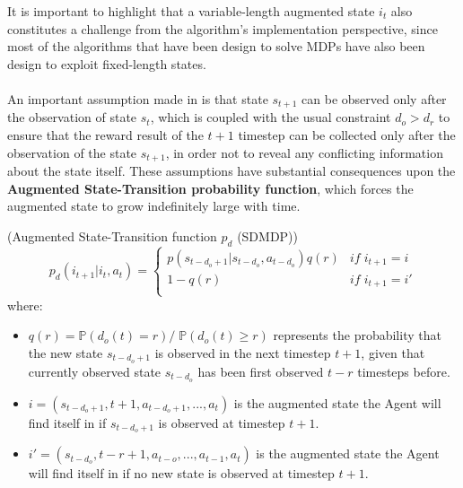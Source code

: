                 It is important to highlight that a variable-length augmented state $i_t$ also constitutes a challenge from the algorithm's implementation perspective, since most of the algorithms that have been design to solve MDPs have also been design to exploit fixed-length states.
                \\\\
                An important assumption made in  is that state $s_{t+1}$ can be observed only after the observation of state $s_t$, which is coupled with the usual constraint $d_o > d_r$ to ensure that the reward result of the $t+1$ timestep can be collected only after the observation of the state $s_{t+1}$, in order not to reveal any conflicting information about the state itself. These assumptions have substantial consequences upon the \textbf{Augmented State-Transition probability function}, which forces the augmented state to grow indefinitely large with time.
                \begin{definition}(Augmented State-Transition function $p_d$ (SDMDP))
                    \label{def:sdmdpaugtrans}
                    \[ p_d \left( i_{t+1} | i_t, a_t \right) =  
                        \begin{cases} 
                            p \left( s_{t-d_o+1} | s_{t-d_o}, a_{t-d_o} \right) q\left(r\right) & if \; i_{t+1} = i \\
                            1 - q\left(r\right) & if \; i_{t+1} = i'\\
                        \end{cases}
                    \]
                    where:
                \end{definition}
                \begin{itemize}[topsep=0.5em, partopsep=0.5em]
                    \setlength\itemsep{0em}
                    \item $q(r) = \mathds{P}\left( d_o(t) = r \right) /\; \mathds{P}\left( d_o(t) \geq r \right) $ represents the probability that the new state $s_{t-d_o+1}$ is observed in the next timestep $t+1$, given that currently observed state $s_{t-d_o}$ has been first observed $t-r$ timesteps before.
                    \item $i = \left( s_{t-d_o+1}, t+1, a_{t-d_o+1}, ..., a_{t}\right)$ is the augmented state the Agent will find itself in if $s_{t-d_o+1}$ is observed at timestep $t+1$.
                    \item $i' = \left( s_{t-d_o}, t-r+1, a_{t-o}, ..., a_{t-1}, a_{t} \right)$  is the augmented state the Agent will find itself in if no new state is observed at timestep $t+1$.
                \end{itemize}
